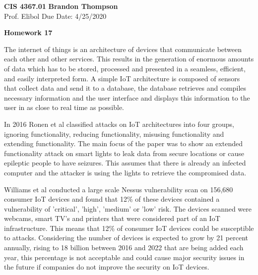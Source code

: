 \documentclass[12pt]{article}
\begin{document}
\noindent
\textbf{CIS 4367.01} \hfill \textbf{Brandon Thompson} \\
\normalsize Prof. Elibol \hfill Due Date: 4/25/2020 \\

\begin{center}
\textbf{Homework 17}
\end{center}

	\doublespacing

	The internet of things is an architecture of devices that communicate between 
	each other and other services. This results in the generation of enormous amounts
	of data which has to be stored, processed and presented in a seamless, efficient,
	and easily interpreted form. \cite{gubbi} A simple IoT architecture is composed
	of sensors that collect data and send it to a database, the database retrieves
	and compiles necessary information and the user interface and displays this information
	to the user in as close to real time as possible.

	In 2016 Ronen et al \cite{ronen} classified attacks on IoT architectures into four groups,
	ignoring functionality, reducing functionality, misusing functionality and extending
	functionality. The main focus of the paper was to show an extended functionality attack
	on smart lights to leak data from secure locations or cause epileptic people to have
	seizures. This assumes that there is already an infected computer and the attacker is
	using the lights to retrieve the compromised data.

	Williams et al \cite{williams} conducted a large scale Nessus vulnerability scan on 156,680
	consumer IoT devices and found that 12\% of these devices contained a vulnerability of
	'critical', 'high', 'medium' or 'low' risk. The devices scanned were webcams, smart TV's
	and printers that were considered part of an IoT infrastructure. This means that 12\% of
	consumer IoT devices could be susceptible to attacks. Considering the number of devices
	is expected to grow by 21 percent annually, rising to 18 billion between 2016 and 2022
	\cite{ericson}
	that are being added each year, this percentage is not acceptable and could cause major
	security issues in the future if companies do not improve the security on IoT devices.

	\newpage
	{}
	
\end{document}
